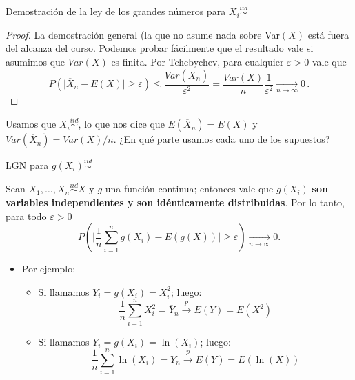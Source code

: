 \documentclass{beamer}
\theoremstyle{definition}
\begin{document}
\begin{frame}{\color{rosee}Demostración de la ley de los grandes n\'umeros para $X_i\stackrel{iid}{\sim}$}\small

  \begin{proof}
    La demostraci\'on general (la que no asume nada sobre Var$(X)$ est\'a fuera del alcanza del curso. Podemos
    probar f\'acilmente que el resultado vale si asumimos que $Var(X)$ es finita. Por Tchebychev, para cualquier $\varepsilon > 0$ vale que 
    \[P\left( \vert \overline{X}_{n}-E(X) \vert \geq
      \varepsilon\right)\leq \frac{Var(\overline{X}_{n})}{\varepsilon^{2}} = \frac{Var(X)}{n} 
    \frac{1}{\varepsilon^{2}}
    \underset{n\to\infty}{\longrightarrow} 0\,.\]
  \end{proof}
  
  \vspace{6pt}
  Usamos que $X_i \stackrel{iid}{\sim}$, lo que nos dice que $E(\overline{X}_n)=E(X)$ y $Var(\overline{X}_n)=Var(X)/n$. ¿En qué parte usamos cada uno de los supuestos?
\end{frame}

\begin{frame}{\color{rosee}LGN para $g(X_i)\stackrel{iid}{\sim}$}\small
  
    Sean $X_{1},\dots,X_{n}\stackrel{iid}{\sim} X$ y $g$ una función continua; entonces vale que $g(X_i)$ \textbf{son variables independientes y son idénticamente distribuidas}. Por lo tanto, para todo $\varepsilon>0$ 
    \begin{equation*}
      P\left( \Big| \frac{1}{n}\sum_{i=1}^ng(X_i)-E(g(X)) \Big| \geq \varepsilon\right)
      \underset{n\to\infty}{\longrightarrow} 0. 
    \end{equation*}
  
\bigskip
\begin{itemize}
    \item %
    Por ejemplo:\medskip
    \begin{itemize}
   \item Si llamamos $Y_i=g(X_i)=X_i^2$; luego:  \[ \dfrac{1}{n}\displaystyle\sum_{i=1}^{n} X_i^2 = \overline{Y}_n \overset{p}{\to} E(Y) = E(X^2)\]
        \item Si llamamos $Y_i=g(X_i)=\ln(X_i)$; luego: \[\dfrac{1}{n}\displaystyle\sum_{i=1}^{n} \ln(X_i) = \overline{Y}_n \overset{p}{\to} E(Y) = E(\ln(X))\]
    \end{itemize}
    
\end{itemize}

\end{frame}
\end{document}
